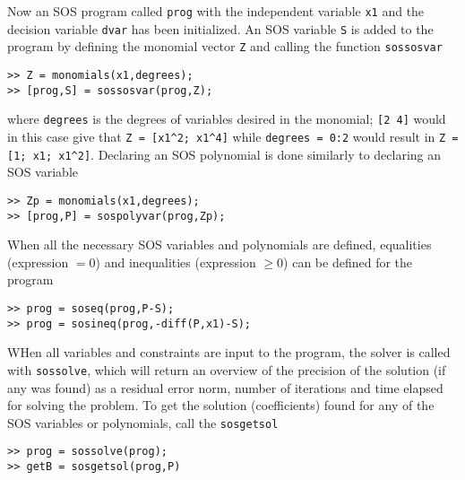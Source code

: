 Now an SOS program called \texttt{prog} with the independent variable \texttt{x1} and the decision variable \texttt{dvar} has been initialized. An SOS variable \texttt{S} is added to the program by defining the monomial vector \texttt{Z} and calling the function \texttt{sossosvar}

\hspace*{1cm} \texttt{>> Z = monomials(x1,degrees);}\\
\hspace*{1cm} \texttt{>> [prog,S] = sossosvar(prog,Z);}

where \texttt{degrees} is the degrees of variables desired in the monomial; \texttt{[2 4]} would in this case give that \verb|Z = [x1^2; x1^4]| while \texttt{degrees = 0:2} would result in \verb|Z = [1; x1; x1^2]|. Declaring an SOS polynomial is done similarly to declaring an SOS variable

\hspace*{1cm} \texttt{>> Zp = monomials(x1,degrees);}\\
\hspace*{1cm} \texttt{>> [prog,P] = sospolyvar(prog,Zp);}

When all the necessary SOS variables and polynomials are defined, equalities (expression $=0$) and inequalities (expression $\geq 0$) can be defined for the program

\hspace*{1cm} \texttt{>> prog = soseq(prog,P-S);}\\
\hspace*{1cm} \texttt{>> prog = sosineq(prog,-diff(P,x1)-S);}

WHen all variables and constraints are input to the program, the solver is called with \texttt{sossolve}, which will return an overview of the precision of the solution (if any was found) as a residual error norm, number of iterations and time elapsed for solving the problem. To get the solution (coefficients) found for any of the SOS variables or polynomials, call the \texttt{sosgetsol}

\hspace*{1cm} \texttt{>> prog = sossolve(prog);}\\
\hspace*{1cm} \texttt{>> getB = sosgetsol(prog,P)}


